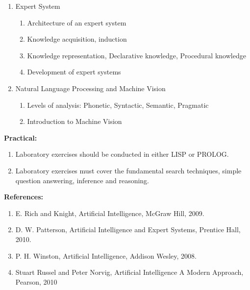 \begin{enumerate}
\begin{enumerate}
      \item Expert System
        \begin{enumerate}
          \item Architecture of an expert system
          \item Knowledge acquisition, induction
          \item Knowledge representation, Declarative knowledge, Procedural knowledge
          \item Development of expert systems
        \end{enumerate}

      \item Natural Language Processing and Machine Vision
        \begin{enumerate}
          \item Levels of analysis: Phonetic, Syntactic, Semantic, Pragmatic
          \item Introduction to Machine Vision
        \end{enumerate}
    \end{enumerate}
    \vs
\end{enumerate}
\Vs

\noindent \textbf{Practical:}
  \begin{enumerate}[label=\arabic*.]
    \item Laboratory exercises should be conducted in either LISP or PROLOG.
    \item Laboratory exercises must cover the fundamental search techniques, simple question answering, inference and reasoning.
  \end{enumerate}
  \Vs

\noindent \textbf{References:}
  \begin{enumerate}[label=\arabic*.]
    \item E. Rich and Knight, Artificial Intelligence, McGraw Hill, 2009.
    \item D. W. Patterson, Artificial Intelligence and Expert Systems, Prentice Hall, 2010.
    \item P. H. Winston, Artificial Intelligence, Addison Wesley, 2008.
    \item Stuart Russel and Peter Norvig, Artificial Intelligence A Modern Approach, Pearson, 2010
  \end{enumerate}

\newpage